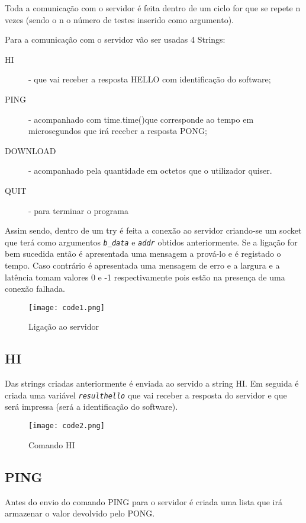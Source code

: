 \documentclass{report}
\begin{document}
Toda a comunicação com o servidor é feita dentro de um ciclo for que se repete n vezes (sendo o n o número de testes inserido como argumento).


Para a comunicação com o servidor vão ser usadas 4 Strings:
\begin{description}
\item[HI] - que vai receber a resposta HELLO com identificação do software;
\item[PING] - acompanhado com time.time()que corresponde ao tempo em microsegundos que irá receber a resposta PONG;
\item[DOWNLOAD] - acompanhado pela quantidade em octetos que o utilizador quiser.
\item[QUIT] - para terminar o programa
\end{description}

Assim sendo, dentro de um try é feita a conexão ao servidor criando-se
um socket que terá como argumentos {\itshape \texttt{b\_data}} e {\itshape \texttt{addr}} obtidos anteriormente. Se a ligação for bem sucedida então é apresentada uma mensagem a prová-lo e é registado o tempo. Caso contrário é apresentada uma mensagem de erro e a largura e a latência tomam valores 0 e -1 respectivamente pois estão na presença de uma conexão falhada.

\begin{figure}[h]
\center %
\texttt{[image: code1.png]}
\caption{Ligação ao servidor}
\label{fig:code1}
\end{figure}

\subsection{HI}
 Das strings criadas anteriormente é enviada ao servido a string HI.
 Em seguida é criada uma variável {\itshape \texttt{resulthello}} que vai receber a resposta do servidor e que será impressa (será a identificação do software).
 
 
\begin{figure}[h]
\center %
\texttt{[image: code2.png]}
\caption{Comando HI}
\label{fig:code2}
\end{figure}

\subsection{PING}

Antes do envio do comando PING para o servidor é criada uma lista que irá armazenar o valor devolvido pelo PONG. 
\end{document}
